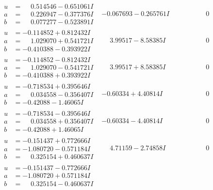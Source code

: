 \documentclass[1p]{elsarticle_modified}
\theoremstyle{definition}
\begin{document}
$$\begin{array}{c|c|c}
\begin{aligned}
u &= \phantom{-}0.514546 - 0.651061 I \\
a &= \phantom{-}0.226947 - 0.377376 I \\
b &= \phantom{-}0.077277 - 0.523891 I\end{aligned}
 & -0.067693 - 0.265761 I & \phantom{-0.000000 } 0 \\ \hline\begin{aligned}
u &= -0.114852 + 0.812432 I \\
a &= \phantom{-}1.029070 + 0.541721 I \\
b &= -0.410388 - 0.393922 I\end{aligned}
 & \phantom{-}3.99517 - 8.58385 I & \phantom{-0.000000 } 0 \\ \hline\begin{aligned}
u &= -0.114852 - 0.812432 I \\
a &= \phantom{-}1.029070 - 0.541721 I \\
b &= -0.410388 + 0.393922 I\end{aligned}
 & \phantom{-}3.99517 + 8.58385 I & \phantom{-0.000000 } 0 \\ \hline\begin{aligned}
u &= -0.718534 + 0.395646 I \\
a &= \phantom{-}0.034558 - 0.356407 I \\
b &= -0.42088 - 1.46065 I\end{aligned}
 & -0.60334 + 4.40814 I & \phantom{-0.000000 } 0 \\ \hline\begin{aligned}
u &= -0.718534 - 0.395646 I \\
a &= \phantom{-}0.034558 + 0.356407 I \\
b &= -0.42088 + 1.46065 I\end{aligned}
 & -0.60334 - 4.40814 I & \phantom{-0.000000 } 0 \\ \hline\begin{aligned}
u &= -0.151437 + 0.772666 I \\
a &= -1.080720 - 0.571184 I \\
b &= \phantom{-}0.325154 + 0.460637 I\end{aligned}
 & \phantom{-}4.71159 - 2.74858 I & \phantom{-0.000000 } 0 \\ \hline\begin{aligned}
u &= -0.151437 - 0.772666 I \\
a &= -1.080720 + 0.571184 I \\
b &= \phantom{-}0.325154 - 0.460637 I\end{aligned}

\end{array}$$
\end{document}
